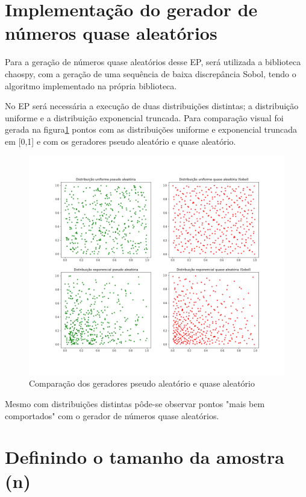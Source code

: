 \documentclass{article}
\begin{document}
\section{Implementação do gerador de números quase aleatórios}

Para a geração de números quase aleatórios desse EP, será utilizada a biblioteca chaospy\cite{FEINBERG201546}, com a geração de uma sequência de baixa discrepância Sobol, tendo o algoritmo implementado na própria biblioteca.

No EP será necessária a execução de duas distribuições distintas; a distribuição uniforme e a distribuição exponencial truncada. Para comparação visual foi gerada na figura\ref{fig:Comp_pseudo_quase} pontos com as distribuições uniforme e exponencial truncada em [0,1] e com os geradores pseudo aleatório e quase aleatório.

\begin{figure}[H]
    \centering
    \includegraphics[width=.9\linewidth]{Imagens/Comparacao_Distribuicao.png}
    \caption{Comparação dos geradores pseudo aleatório e quase aleatório}
    \label{fig:Comp_pseudo_quase}
\end{figure}

Mesmo com distribuições distintas pôde-se observar pontos "mais bem comportados" com o gerador de números quase aleatórios.

\section{Definindo o tamanho da amostra (n)}
\end{document}
